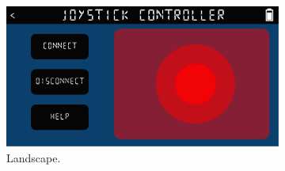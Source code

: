 \documentclass{l4proj}
\begin{document}
\begin{appendices}
\begin{figure}[!ht]
    \centering
    \begin{subfigure}{0.67\textwidth}
        \centering
        \includegraphics[width=\textwidth]{images/joystick-wireframe.pdf}
        \caption{Landscape.}
        \label{fig:joystick-wireframe} 
    \end{subfigure}
    \begin{subfigure}{0.32\textwidth}
        \centering

\end{subfigure}
\end{figure}
\end{appendices}
\end{document}
